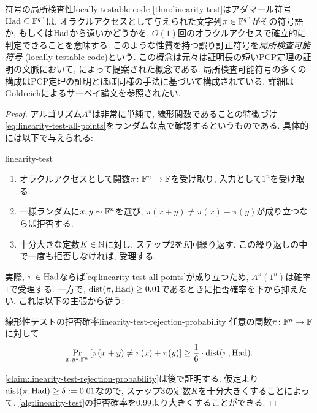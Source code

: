 \begin{remark}{符号の局所検査性}{locally-testable-code}
  \cref{thm:linearity-test}はアダマール符号$\mathrm{Had}\subseteq\mathbb{F}^{q^n}$は, オラクルアクセスとして与えられた文字列$\pi\in\mathbb{F}^{q^n}$がその符号語か, もしくは$\mathrm{Had}$から遠いかどうかを, $O(1)$回のオラクルアクセスで確立的に判定できることを意味する.
  このような性質を持つ誤り訂正符号を\emph{局所検査可能符号} (locally testable code)という. この概念は元々は証明長の短いPCP定理の証明の文脈において, \citet{GS06}によって提案された概念である.
  局所検査可能符号の多くの構成はPCP定理の証明とほぼ同様の手法に基づいて構成されている. 詳細はGoldreichによるサーベイ論文\cite{Gol10}を参照されたい.
\end{remark}
\begin{proof}
  アルゴリズム$A^\pi$は非常に単純で, 線形関数であることの特徴づけ\cref{eq:linearity-test-all-points}をランダムな点で確認するというものである.
  具体的には以下で与えられる:
  \begin{algo}{}{linearity-test}
    \begin{enumerate}
      \item オラクルアクセスとして関数$\pi\colon \mathbb{F}^n\to\mathbb{F}$を受け取り, 入力として$1^n$を受け取る.
      \item 一様ランダムに$x,y\sim\mathbb{F}^n$を選び, $\pi(x+y)\ne \pi(x)+\pi(y)$が成り立つならば拒否する.
      \item 十分大きな定数$K\in\mathbb{N}$に対し, ステップ2を$K$回繰り返す. この繰り返しの中で一度も拒否しなければ, 受理する.
    \end{enumerate}
  \end{algo}

  実際, $\pi\in\mathrm{Had}$ならば\cref{eq:linearity-test-all-points}が成り立つため, $A^\pi(1^n)$は確率$1$で受理する.
  一方で, $\mathrm{dist}(\pi,\mathrm{Had})\ge 0.01$であるときに拒否確率を下から抑えたい.
  これは以下の主張から従う:

  \begin{claim}{線形性テストの拒否確率}{linearity-test-rejection-probability}
    任意の関数$\pi\colon \mathbb{F}^n\to\mathbb{F}$に対して
    \begin{align*}
      \Pr_{x,y\sim\mathbb{F}^n}\qty[ \pi(x+y) \ne \pi(x)+\pi(y) ] \ge \frac{1}{6}\cdot \mathrm{dist}(\pi,\mathrm{Had}).
    \end{align*}  
  \end{claim}

  \cref{claim:linearity-test-rejection-probability}は後で証明する.
  仮定より$\mathrm{dist}(\pi,\mathrm{Had})\ge \delta:=0.01$なので,
  ステップ3の定数$K$を十分大きくすることによって, \cref{alg:linearity-test}の拒否確率を$0.99$より大きくすることができる.
  \end{proof}

